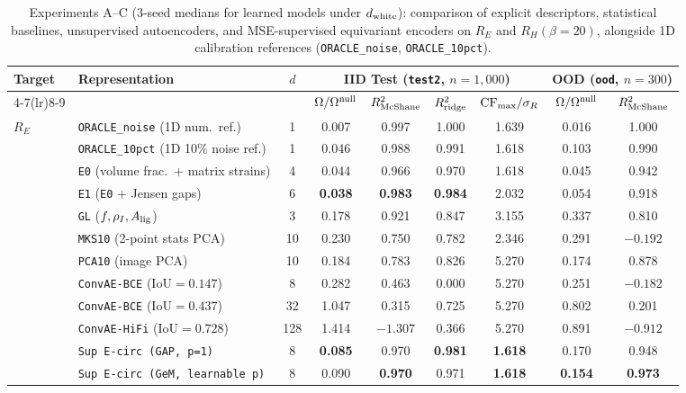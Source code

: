 \documentclass[preprint,11pt,a4paper]{elsarticle}
\begin{document}
\begin{table}[ht!]
\centering
\caption{Experiments A--C (3-seed medians for learned models under $d_{\rm white}$): comparison of explicit descriptors, statistical baselines, unsupervised autoencoders, and MSE-supervised equivariant encoders on $R_E$ and $R_H(\beta=20)$, alongside 1D calibration references (\texttt{ORACLE\_noise}, \texttt{ORACLE\_10pct}).}
\label{tab:exp_abc}
\footnotesize
\setlength{\tabcolsep}{3.6pt}
\begin{tabular}{llccccccc}
\toprule
Target & Representation & $d$ & \multicolumn{4}{c}{IID Test (\texttt{test2}, $n=1{,}000$)} & \multicolumn{2}{c}{OOD (\texttt{ood}, $n=300$)} \\
\cmidrule(lr){4-7}\cmidrule(lr){8-9}
 & & & $\Omega/\Omega^{\rm null}$ & $R^2_{\rm McShane}$ & $R^2_{\rm ridge}$ & ${\rm CF}_{\max}/\sigma_R$ & $\Omega/\Omega^{\rm null}$ & $R^2_{\rm McShane}$ \\
\midrule
$R_E$
 & \texttt{ORACLE\_noise} (1D num.\ ref.) & 1 & 0.007 & 0.997 & 1.000 & 1.639 & 0.016 & 1.000 \\
 & \texttt{ORACLE\_10pct} (1D 10\% noise ref.) & 1 & 0.046 & 0.988 & 0.991 & 1.618 & 0.103 & 0.990 \\
 & \texttt{E0} (volume frac.\ + matrix strains) & 4 & 0.044 & 0.966 & 0.970 & 1.618 & 0.045 & 0.942 \\
 & \texttt{E1} (\texttt{E0} + Jensen gaps) & 6 & \textbf{0.038} & \textbf{0.983} & \textbf{0.984} & 2.032 & 0.054 & 0.918 \\
 & \texttt{GL} ($f, \rho_I, A_{\rm lig}$) & 3 & 0.178 & 0.921 & 0.847 & 3.155 & 0.337 & 0.810 \\
 & \texttt{MKS10} (2-point stats PCA) & 10 & 0.230 & 0.750 & 0.782 & 2.346 & 0.291 & $-0.192$ \\
 & \texttt{PCA10} (image PCA) & 10 & 0.184 & 0.783 & 0.826 & 5.270 & 0.174 & 0.878 \\
 & \texttt{ConvAE-BCE} ($\text{IoU}=0.147$) & 8 & 0.282 & 0.463 & 0.000 & 5.270 & 0.251 & $-0.182$ \\
 & \texttt{ConvAE-BCE} ($\text{IoU}=0.437$) & 32 & 1.047 & 0.315 & 0.725 & 5.270 & 0.802 & 0.201 \\
 & \texttt{ConvAE-HiFi} ($\text{IoU}=0.728$) & 128 & 1.414 & $-1.307$ & 0.366 & 5.270 & 0.891 & $-0.912$ \\
 & \texttt{Sup E-circ (GAP, p=1)} & 8 & \textbf{0.085} & 0.970 & \textbf{0.981} & \textbf{1.618} & 0.170 & 0.948 \\
 & \texttt{Sup E-circ (GeM, learnable p)} & 8 & 0.090 & \textbf{0.970} & 0.971 & \textbf{1.618} & \textbf{0.154} & \textbf{0.973} \\

\end{tabular}
\end{table}
\end{document}
